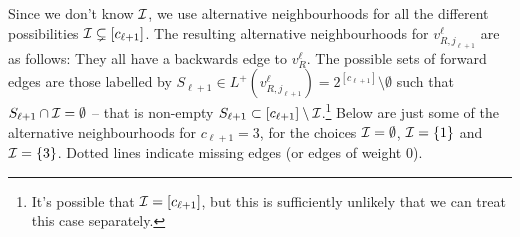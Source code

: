 \documentclass{theoretics}
\renewcommand{\>}{\rangle}
\newcommand{\<}{\langle}
\renewcommand{\(}{\left(}
\renewcommand{\)}{\right)}
\begin{document}
Since we don't know ${\cal I}$, we use alternative neighbourhoods for all the different possibilities ${\cal I}\subsetneq [c_{\ell+1}]$. 
The resulting alternative neighbourhoods for $v_{R,j_{\ell+1}}^{\ell}$ are as follows: They all have a backwards edge to $v_{R}^{\ell}$. The possible sets of forward edges are those labelled by $S_{\ell+1}\in L^+(v_{R,j_{\ell+1}}^\ell)=2^{[c_{\ell+1}]}\setminus\emptyset$ such that $S_{\ell+1}\cap {\cal I} = \emptyset$ -- that is non-empty $S_{\ell+1}\subset [c_{\ell+1}]\setminus {\cal I}$.\footnote{It's possible that ${\cal I}=[c_{\ell+1}]$, but this is sufficiently unlikely that we can treat this case separately.} Below are just some of the alternative neighbourhoods for $c_{\ell+1}=3$, for the choices ${\cal I}=\emptyset$, ${\cal I}=\{1\}$ and ${\cal I}=\{3\}$. Dotted lines indicate missing edges (or edges of weight 0). 
\end{document}
